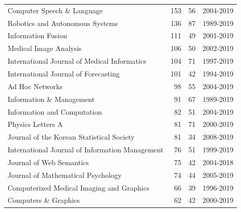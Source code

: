 \documentclass[12pt]{article}
\begin{document}
\begin{center}
{\begin{longtable}{lrrl}
			Computer Speech \& Language                                                          &       153 &       56 & 2004-2019 \\
			Robotics and Autonomous Systems                                                      &       136 &       87 & 1989-2019 \\
			Information Fusion                                                                   &       111 &       49 & 2001-2019 \\
			Medical Image Analysis                                                               &       106 &       50 & 2002-2019 \\
			International Journal of Medical Informatics                                         &       104 &       71 & 1997-2019 \\
			International Journal of Forecasting                                                 &       101 &       42 & 1994-2019 \\
			Ad Hoc Networks                                                                      &        98 &       55 & 2004-2019 \\
			Information \& Management                                                            &        91 &       67 & 1989-2019 \\
			Information and Computation                                                          &        82 &       51 & 2004-2019 \\
			Physics Letters A                                                                    &        81 &       71 & 2000-2019 \\
			Journal of the Korean Statistical Society                                            &        81 &       34 & 2008-2019 \\
			International Journal of Information Management                                      &        76 &       51 & 1999-2019 \\
			Journal of Web Semantics                                                             &        75 &       42 & 2004-2018 \\
			Journal of Mathematical Psychology                                                   &        74 &       44 & 2005-2019 \\
			Computerized Medical Imaging and Graphics                                            &        66 &       39 & 1996-2019 \\
			Computers \& Graphics                                                                &        62 &       42 & 2000-2019 \\

\end{longtable}}
\end{center}
\end{document}
